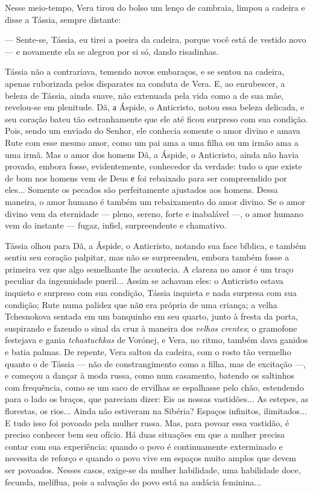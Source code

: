 Nesse meio-tempo, Vera tirou do bolso um lenço de cambraia, limpou a
cadeira e disse a Tássia, sempre distante:

--- Sente-se, Tássia, eu tirei a poeira da cadeira, porque você está de
vestido novo --- e novamente ela se alegrou por si só, dando risadinhas.

Tássia não a contrariava, temendo novos embaraços, e se sentou na
cadeira, apenas ruborizada pelos disparates na conduta de Vera. E, ao
enrubescer, a beleza de Tássia, ainda suave, não extenuada pela vida
como a de sua mãe, revelou-se em plenitude. Dã, а Áspide, o Anticristo,
notou essa beleza delicada, e seu coração bateu tão estranhamente que
ele até ficou surpreso com sua condição. Pois, sendo um enviado do
Senhor, ele conhecia somente o amor divino e amava Rute com esse mesmo
amor, como um pai ama a uma filha ou um irmão ama a uma irmã. Mas o amor
dos homens Dã, a Áspide, o Anticristo, ainda não havia provado, embora
fosse, evidentemente, conhecedor da verdade: tudo o que existe de bom
nos homens vem de Deus е foi rebaixado para ser compreendido por eles...
Somente os pecados são perfeitamente ajustados aos homens. Dessa
maneira, o amor humano é também um rebaixamento do amor divino. Se o
amor divino vem da eternidade --- pleno, sereno, forte e inabalável ---,
o amor humano vem do instante --- fugaz, infiel, surpreendente e
chamativo.

Tássia olhou para Dã, a Áspide, o Anticristo, notando sua face bíblica,
e também sentiu seu coração palpitar, mas não se surpreendeu, embora
também fosse a primeira vez que algo semelhante lhe acontecia. A clareza
no amor é um traço peculiar da ingenuidade pueril... Assim se achavam
eles: o Anticristo estava inquieto e surpreso com sua condição, Tássia
inquieta e nada surpresa com sua condição; Rute numa palidez que nãо era
própria de uma criança; a velha Tchesnokova sentada em um banquinho em
seu quarto, junto à fresta da porta, suspirando e fazendo o sinal da
cruz à maneira dos \emph{velhos crentes}; o gramofone festejava e gania
\emph{tchastuchkas} de Vorónej, e Vera, no ritmo, também dava ganidos e
batia palmas. De repente, Vera saltou da cadeira, com o rosto tão
vermelho quanto o de Tássia --- não de constrangimento como a filha, mas
de excitação ---, e começou a dançar à moda russa, como num casamento,
batendo os saltinhos com frequência, como se um saco de ervilhas se
espalhasse pelo chão, estendendo para o lado os braços, que pareciam
dizer: Eis as nossas vastidões... As estepes, as florestas, os rios...
Ainda não estiveram na Sibéria? Espaços infinitos, ilimitados... E tudo
isso foi povoado pela mulher russa. Mas, para povoar essa vastidão, é
preciso conhecer bem seu ofício. Há duas situações em que a mulher
precisa contar com sua experiência: quando o povo é continuamente
exterminado e necessita de reforço e quando o povo vive em espaços muito
amplos que devem ser povoados. Nesses casos, exige-se da mulher
habilidade, uma habilidade doce, fecunda, melíflua, pois a salvação do
povo está na audácia feminina...

